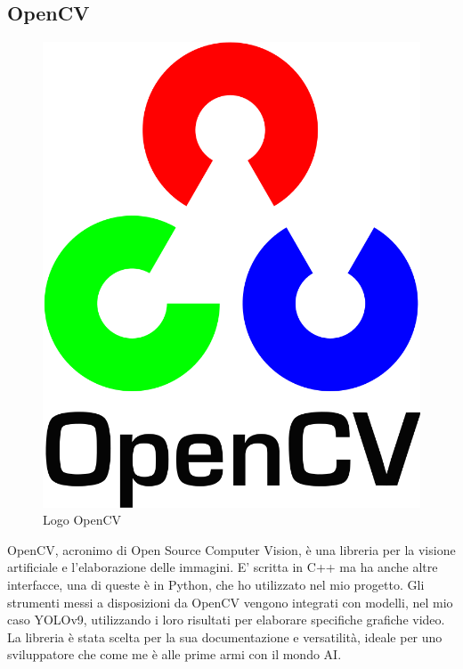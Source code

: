 \subsection{OpenCV}
\begin{figure}
\centering
\vspace{-10px}
\includegraphics[scale=0.1]{img/OpenCv.png}
\caption{Logo OpenCV}
\end{figure}

OpenCV, acronimo di Open Source Computer Vision, è una libreria per la visione artificiale e l'elaborazione delle immagini. E' scritta in C++ ma ha anche altre interfacce, una di queste è in Python, che ho utilizzato nel mio progetto. Gli strumenti messi a disposizioni da OpenCV vengono integrati con modelli, nel mio caso YOLOv9, utilizzando i loro risultati per elaborare specifiche grafiche video. La libreria è stata scelta per la sua documentazione e versatilità, ideale per uno sviluppatore che come me è alle prime armi con il mondo AI.  

